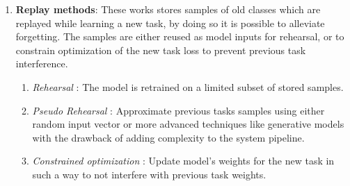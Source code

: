 \begin{enumerate}
    \item \textbf{Replay methods}: These works stores samples of old classes which are replayed while learning a new task, by doing so it is possible to alleviate forgetting.
    The samples are either reused as model inputs for rehearsal, or to constrain optimization of the new task loss to prevent previous task interference.

    \begin{enumerate}
        \item \textit{Rehearsal} \cite{rebuffi2017icarl, rolnick2019experience, isele2018selective, chaudhry2019continual, de2021continual}: The model is retrained on a limited subset of stored samples.
        \item \textit{Pseudo Rehearsal} \cite{shin2017continual, atkinson1802pseudo, lavda2018continual, ramapuram2020lifelong}: Approximate previous tasks samples using either random input vector or more advanced techniques like generative models with the drawback of adding complexity to the system pipeline.
        \item \textit{Constrained optimization} \cite{lopez2017gradient, chaudhry2018efficient, aljundi2019online}: Update model's weights for the new task in such a way to not interfere with previous task weights.
    \end{enumerate}
    

\end{enumerate}
